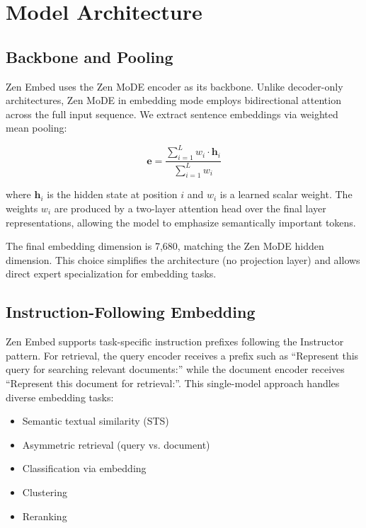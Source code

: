 \documentclass[11pt,a4paper]{article}
\begin{document}
\section{Model Architecture}

\subsection{Backbone and Pooling}

Zen Embed uses the Zen MoDE encoder as its backbone. Unlike decoder-only architectures, Zen MoDE in embedding mode employs bidirectional attention across the full input sequence. We extract sentence embeddings via weighted mean pooling:

\begin{equation}
\mathbf{e} = \frac{\sum_{i=1}^{L} w_i \cdot \mathbf{h}_i}{\sum_{i=1}^{L} w_i}
\end{equation}

where $\mathbf{h}_i$ is the hidden state at position $i$ and $w_i$ is a learned scalar weight. The weights $w_i$ are produced by a two-layer attention head over the final layer representations, allowing the model to emphasize semantically important tokens.

The final embedding dimension is 7,680, matching the Zen MoDE hidden dimension. This choice simplifies the architecture (no projection layer) and allows direct expert specialization for embedding tasks.

\subsection{Instruction-Following Embedding}

Zen Embed supports task-specific instruction prefixes following the Instructor pattern. For retrieval, the query encoder receives a prefix such as ``Represent this query for searching relevant documents:'' while the document encoder receives ``Represent this document for retrieval:''. This single-model approach handles diverse embedding tasks:

\begin{itemize}
  \item Semantic textual similarity (STS)
  \item Asymmetric retrieval (query vs. document)
  \item Classification via embedding
  \item Clustering
  \item Reranking
\end{itemize}
\end{document}
